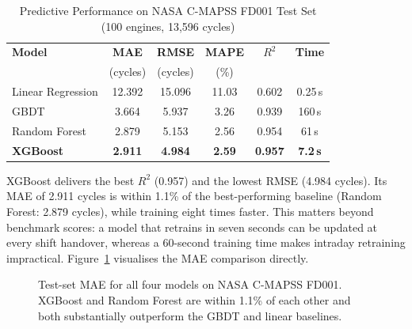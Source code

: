 \documentclass[10pt, journal, letterpaper]{IEEEtran}
\begin{document}
\begin{table}[htbp]
\caption{Predictive Performance on NASA C-MAPSS FD001 Test Set\\
(100 engines, 13,596 cycles)}
\label{tab:perf}
\centering\small
\begin{tabular}{lccccc}
\toprule
\textbf{Model} & \textbf{MAE} & \textbf{RMSE} & \textbf{MAPE} & $R^2$ & \textbf{Time} \\
               & (cycles) & (cycles) & (\%) & & \\
\midrule
Linear Regression  & 12.392 & 15.096 & 11.03 & 0.602 & 0.25\,s \\
GBDT               &  3.664 &  5.937 &  3.26 & 0.939 & 160\,s  \\
Random Forest      &  2.879 &  5.153 &  2.56 & 0.954 & 61\,s   \\
\textbf{XGBoost}   & \textbf{2.911} & \textbf{4.984} & \textbf{2.59} & \textbf{0.957} & \textbf{7.2\,s} \\
\bottomrule
\end{tabular}
\end{table}

XGBoost delivers the best $R^2$ (0.957) and the lowest RMSE (4.984 cycles).
Its MAE of 2.911 cycles is within 1.1\% of the best-performing baseline
(Random Forest: 2.879 cycles), while training eight times faster. This
matters beyond benchmark scores: a model that retrains in seven seconds can
be updated at every shift handover, whereas a 60-second training time makes
intraday retraining impractical. Figure~\ref{fig:model_bar} visualises the
MAE comparison directly.

\begin{figure}[htbp]
\centering
{}
\caption{Test-set MAE for all four models on NASA C-MAPSS FD001.
XGBoost and Random Forest are within 1.1\% of each other and both
substantially outperform the GBDT and linear baselines.}
\label{fig:model_bar}
\end{figure}
\end{document}
